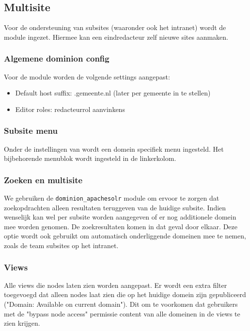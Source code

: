 \subsection{Multisite}\label{multisite}

Voor de ondersteuning van subsites (waaronder ook het intranet) wordt de  module ingezet. Hiermee kan een eindredacteur zelf nieuwe sites aanmaken.

\subsubsection{Algemene dominion config}
Voor de  module worden de volgende settings aangepast:
\begin{itemize}
\item Default host suffix: .gemeente.nl (later per gemeente in te stellen)
\item Editor roles: redacteurrol aanvinkens
\end{itemize}

\subsubsection{Subsite menu}
Onder de instellingen van  wordt een domein specifiek menu ingesteld. Het bijbehorende menublok wordt ingesteld in de linkerkolom.

\subsubsection{Zoeken en multisite}
We gebruiken de \texttt{dominion\_apachesolr} module om ervoor te zorgen dat zoekopdrachten alleen resultaten teruggeven van de huidige subsite. Indien wenselijk kan wel per subsite worden aangegeven of er nog additionele domein mee worden genomen. De zoekresultaten komen in dat geval door elkaar. Deze optie wordt ook gebruikt om automatisch onderliggende domeinen mee te nemen, zoals de team subsites op het intranet.

\subsubsection{Views}
Alle views die nodes laten zien worden aangepast. Er wordt een extra filter toegevoegd dat alleen nodes laat zien die op het huidige domein zijn gepubliceerd ("Domain: Available on current domain"). Dit om te voorkomen dat gebruikers met de "bypass node access" permissie content van alle domeinen in de views te zien krijgen.

